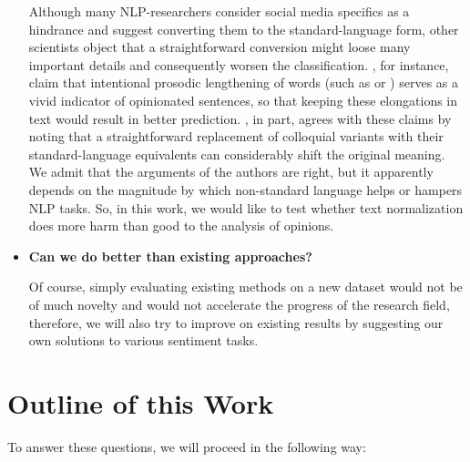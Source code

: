 \begin{itemize}
  Although many NLP-researchers consider social media specifics as a
  hindrance and suggest converting them to the standard-language form,
  other scientists object that a straightforward conversion might
  loose many important details and consequently worsen the
  classification.  \citet{Brody:11}, for instance, claim that
  intentional prosodic lengthening of words (such as
   or ) serves as a
  vivid indicator of opinionated sentences, so that keeping these
  elongations in text would result in better prediction.
  \citet{Eisenstein:13}, in part, agrees with these claims by noting
  that a straightforward replacement of colloquial variants with their
  standard-language equivalents can considerably shift the original
  meaning.  We admit that the arguments of the authors are right, but
  it apparently depends on the magnitude by which non-standard
  language helps or hampers NLP tasks.  So, in this work, we would
  like to test whether text normalization does more harm than good to
  the analysis of opinions.

\item\textbf{Can we do better than existing approaches?}

  Of course, simply evaluating existing methods on a new dataset would
  not be of much novelty and would not accelerate the progress of the
  research field, therefore, we will also try to improve on existing
  results by suggesting our own solutions to various sentiment tasks.
\end{itemize}


\section*{Outline of this Work}

To answer these questions, we will proceed in the following way:

